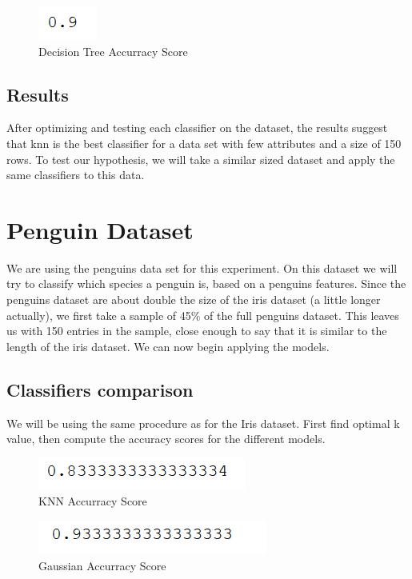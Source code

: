 \documentclass{article}
\begin{document}
\begin{figure}[!h]
  \caption{Decision Tree Accurracy Score}
  \centering
    \includegraphics[scale=0.7]{treeIris.png}
\end{figure}
\FloatBarrier

\subsection{Results}
After optimizing and testing each classifier on the dataset, the results suggest that knn is the best classifier for a data set with few attributes and a size of 150 rows. To test our hypothesis, we will take a similar sized dataset and apply the same classifiers to this data. 

\section{Penguin Dataset}
We are using the penguins data set for this experiment. On this dataset we will try to classify which species a penguin is, based on a penguins features. Since the penguins dataset are about double the size of the iris dataset (a little longer actually), we first take a sample of 45\% of the full penguins dataset. This leaves us with 150 entries in the sample, close enough to say that it is similar to the length of the iris dataset.  We can now begin applying the models.
\subsection{Classifiers comparison}
We will be using the same procedure as for the Iris dataset. First find optimal k value, then compute the accuracy scores for the different models.


\begin{figure}[!h]
  \caption{KNN Accurracy Score}
  \centering
      \includegraphics[scale=0.7]{knnPenguin.png}
\end{figure}


\begin{figure}[!h]
  \centering
  \caption{Gaussian Accurracy Score}
    \includegraphics[scale=0.7]{GaussianPenguin.png}
\end{figure}
\end{document}
